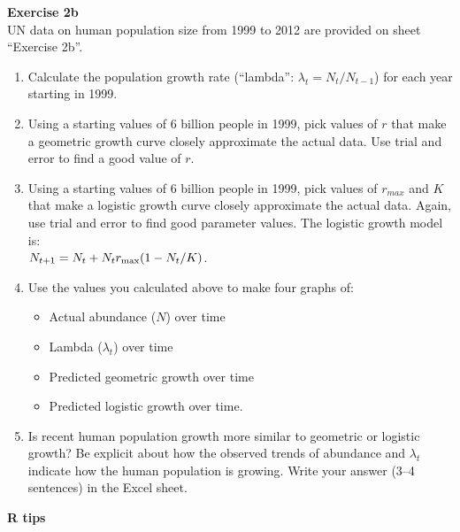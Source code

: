 \documentclass[12pt]{article}\usepackage[]{graphicx}\usepackage[]{color}
\begin{document}
\vspace{24pt}

{\bf Exercise 2b \\}
UN data on human population size from 1999 to 2012 are provided on
sheet ``Exercise 2b''.


\begin{enumerate}
  \item Calculate the population growth rate (``lambda'':
    $\lambda_t = N_{t}/N_{t-1}$) for each year starting in 1999.
  \item Using a starting values of 6 billion people in 1999, pick
    values of $r$ that make a geometric growth curve
    closely approximate the actual data. Use trial and error to find a
    good value of $r$. 
  \item Using a starting values of 6 billion people in 1999, pick
    values of $r_{max}$ and $K$ that make a logistic growth curve
    closely approximate the actual data. Again, use trial and error to
    find good parameter values. The logistic growth model is: \\
    $N_{t+1} = N_t + N_t r_{\rm max}(1 - N_t/K)$.
  \item Use the values you calculated above to make four graphs of:
    \begin{itemize}
      \item Actual abundance ($N$) over time
      \item Lambda ($\lambda_t$) over time
      \item Predicted geometric growth over time
      \item Predicted logistic growth over time.
    \end{itemize}
  \item Is recent human population growth more similar to geometric or
    logistic growth? Be explicit about how the observed trends of
    abundance and $\lambda_t$ indicate how the human population is
    growing. Write your answer (3--4 sentences) in the Excel sheet.
\end{enumerate}



\newpage

{\bf R tips \\}
\end{document}
